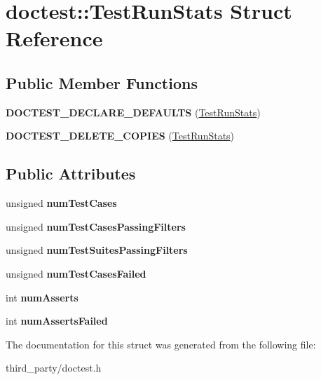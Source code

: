 \hypertarget{structdoctest_1_1_test_run_stats}{}\section{doctest\+::Test\+Run\+Stats Struct Reference}
\label{structdoctest_1_1_test_run_stats}
\subsection*{Public Member Functions}
\begin{DoxyCompactItemize}
\item 
\mbox{\label{structdoctest_1_1_test_run_stats_aa125c8e1eff713b8218b4a823132ff4b}} 
{\bfseries D\+O\+C\+T\+E\+S\+T\+\_\+\+D\+E\+C\+L\+A\+R\+E\+\_\+\+D\+E\+F\+A\+U\+L\+TS} (\mbox{\hyperlink{structdoctest_1_1_test_run_stats}{Test\+Run\+Stats}})
\item 
\mbox{\label{structdoctest_1_1_test_run_stats_af5853d8439d8a1853d1e233f129da809}} 
{\bfseries D\+O\+C\+T\+E\+S\+T\+\_\+\+D\+E\+L\+E\+T\+E\+\_\+\+C\+O\+P\+I\+ES} (\mbox{\hyperlink{structdoctest_1_1_test_run_stats}{Test\+Run\+Stats}})
\end{DoxyCompactItemize}
\subsection*{Public Attributes}
\begin{DoxyCompactItemize}
\item 
\mbox{\label{structdoctest_1_1_test_run_stats_a2f4b38f2f6225b798029b64c1d425999}} 
unsigned {\bfseries num\+Test\+Cases}
\item 
\mbox{\label{structdoctest_1_1_test_run_stats_afd49da305793d2c2622f0b33a63e87b6}} 
unsigned {\bfseries num\+Test\+Cases\+Passing\+Filters}
\item 
\mbox{\label{structdoctest_1_1_test_run_stats_aecbf62d51a6c96875d72124c27096e1d}} 
unsigned {\bfseries num\+Test\+Suites\+Passing\+Filters}
\item 
\mbox{\label{structdoctest_1_1_test_run_stats_adb4acfac3623bf752eff3f8d6ce2ffe7}} 
unsigned {\bfseries num\+Test\+Cases\+Failed}
\item 
\mbox{\label{structdoctest_1_1_test_run_stats_a58f52d165ab0af01acb7d69a7fc53c3a}} 
int {\bfseries num\+Asserts}
\item 
\mbox{\label{structdoctest_1_1_test_run_stats_a27c7ff2c0190e4bad60555cdc68d8f30}} 
int {\bfseries num\+Asserts\+Failed}
\end{DoxyCompactItemize}


The documentation for this struct was generated from the following file\+:\begin{DoxyCompactItemize}
\item 
third\+\_\+party/doctest.\+h\end{DoxyCompactItemize}
